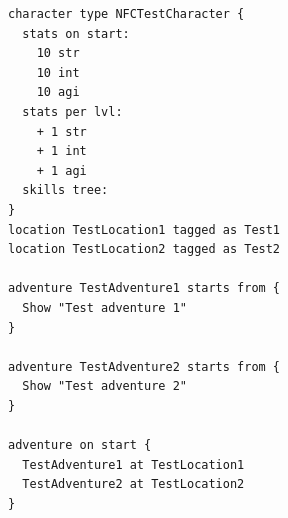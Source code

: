 \documentclass[openright]{xmgr}
\begin{document}
\begin{verbatim}
character type NFCTestCharacter {
  stats on start:
    10 str
    10 int
    10 agi
  stats per lvl:
    + 1 str
    + 1 int
    + 1 agi
  skills tree:
}
location TestLocation1 tagged as Test1
location TestLocation2 tagged as Test2

adventure TestAdventure1 starts from {
  Show "Test adventure 1"
}

adventure TestAdventure2 starts from {
  Show "Test adventure 2"
}

adventure on start {
  TestAdventure1 at TestLocation1
  TestAdventure2 at TestLocation2
}
\end{verbatim}





\listoffigures

\oswiadczenie
\end{document}
